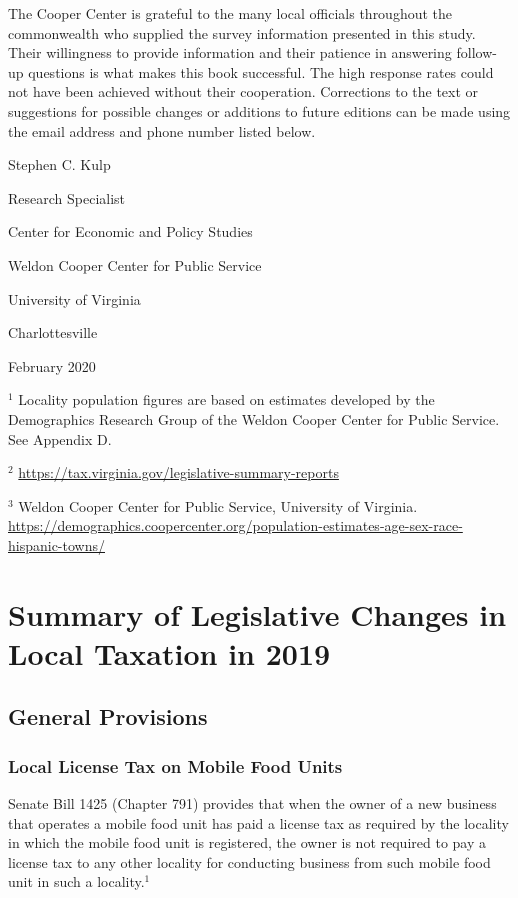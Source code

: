\documentclass[
]{book}
\begin{document}
The Cooper Center is grateful to the many local officials throughout the commonwealth who supplied the survey information presented in this study. Their willingness to provide information and their patience in answering follow-up questions is what makes this book successful. The high response rates could not have been achieved without their cooperation. Corrections to the text or suggestions for possible changes or additions to future editions can be made using the email address and phone number listed below.

Stephen C. Kulp

Research Specialist

Center for Economic and Policy Studies

Weldon Cooper Center for Public Service

University of Virginia

Charlottesville

February 2020

\(^1\) Locality population figures are based on estimates developed by the Demographics Research Group of the Weldon Cooper Center for Public Service. See Appendix D.

\(^2\) \url{https://tax.virginia.gov/legislative-summary-reports}

\(^3\) Weldon Cooper Center for Public Service, University of Virginia. \url{https://demographics.coopercenter.org/population-estimates-age-sex-race-hispanic-towns/}

\hypertarget{summary-of-legislative-changes-in-local-taxation-in-2019}{%
\chapter{Summary of Legislative Changes in Local Taxation in 2019}\label{summary-of-legislative-changes-in-local-taxation-in-2019}}

\hypertarget{general-provisions}{%
\section{General Provisions}\label{general-provisions}}

\hypertarget{local-license-tax-on-mobile-food-units}{%
\subsection{Local License Tax on Mobile Food Units}\label{local-license-tax-on-mobile-food-units}}

Senate Bill 1425 (Chapter 791) provides that when the owner of a new business that operates a mobile food unit has paid a license tax as required by the locality in which the mobile food unit is registered, the owner is not required to pay a license tax to any other locality for conducting business from such mobile food unit in such a locality.\(^1\)
\end{document}
